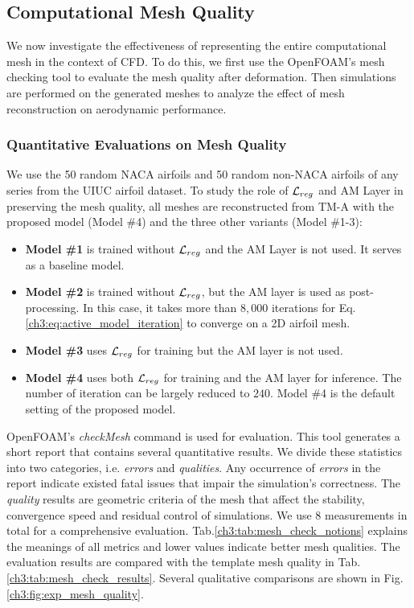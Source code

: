 \subsection{Computational Mesh Quality}
\label{ch3:sec:mesh_quality}

We now investigate the effectiveness of representing the entire computational mesh in the context of CFD.
To do this, we first use the OpenFOAM's mesh checking tool to evaluate the mesh quality after deformation.
Then simulations are performed on the generated meshes to analyze the effect of mesh reconstruction on aerodynamic performance.

\subsubsection{Quantitative Evaluations on Mesh Quality}
We use the 50 random NACA airfoils and 50 random non-NACA airfoils of any series from the UIUC airfoil dataset.
To study the role of $\mathcal{L}_{reg}$ and AM Layer in preserving the mesh quality, all meshes are reconstructed from TM-A with the proposed model (Model \#4) and the three other variants (Model \#1-3):
\begin{itemize}
    \item \textbf{Model \#1} is trained without $\mathcal{L}_{reg}$ and the AM Layer is not used.
    It serves as a baseline model.
    \item \textbf{Model \#2} is trained without $\mathcal{L}_{reg}$, but the AM layer is used as post-processing.
    In this case, it takes more than $8,000$ iterations for Eq.\ref{ch3:eq:active_model_iteration} to converge on a 2D airfoil mesh.
    \item \textbf{Model \#3} uses $\mathcal{L}_{reg}$ for training but the AM layer is not used.
    \item \textbf{Model \#4} uses both $\mathcal{L}_{reg}$ for training and the AM layer for inference.
    The number of iteration can be largely reduced to $240$.
    Model \#4 is the default setting of the proposed model.
\end{itemize}





OpenFOAM's \textit{checkMesh} command  is used for evaluation.
This tool generates a short report that contains several quantitative results.
We divide these statistics into two categories, i.e. \textit{errors} and \textit{qualities}.
Any occurrence of \textit{errors} in the report indicate existed fatal issues that impair the simulation's correctness.
The \textit{quality} results are geometric criteria of the mesh that affect the stability, convergence speed and residual control of simulations.
We use 8 measurements in total for a comprehensive evaluation.
Tab.\ref{ch3:tab:mesh_check_notions} explains the meanings of all metrics and lower values indicate better mesh qualities.
The evaluation results are compared with the template mesh quality in Tab.\ref{ch3:tab:mesh_check_results}.
Several qualitative comparisons are shown in Fig.\ref{ch3:fig:exp_mesh_quality}.

